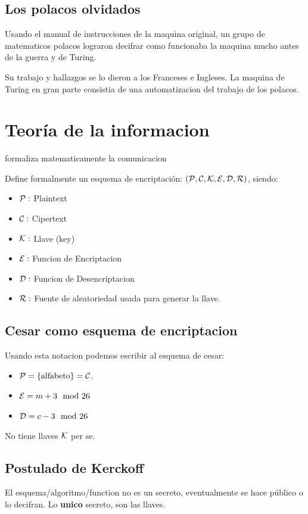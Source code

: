 \documentclass[12pt,a4paper]{report}
\begin{document}
\subsection{Los polacos olvidados}

Usando el manual de instrucciones de la maquina original, un grupo de matematicos polacos lograron decifrar como funcionaba la maquina mucho antes de la guerra y de Turing.

Su trabajo y hallazgos se lo dieron a los Franceses e Ingleses. La maquina de Turing en gran parte consistia de una automatizacion del trabajo de los polacos.



\section{Teoría de la informacion}
\claude formaliza matematicamente la comunicacion

Define formalmente un esquema de encriptación: $(\mathcal{{P}}, \mathcal{{C}}, \mathcal{{K}}, \mathcal{{E}}, \mathcal{{D}}, \mathcal{{R}})$, siendo:

\begin{itemize}
    \item{$\mathcal{{P}}:$ Plaintext }
    \item{$\mathcal{{C}}:$ Cipertext }
    \item{$\mathcal{{K}}:$ Llave (key)}
    \item{$\mathcal{{E}}:$ Funcion de Encriptacion}
    \item{$\mathcal{{D}}:$ Funcion de Desencriptacion}
    \item{$\mathcal{{R}}:$ Fuente de aleatoriedad usada para generar la llave.}
\end{itemize}

\alicebob

\subsection{Cesar como esquema de encriptacion}
Usando esta notacion podemos escribir al esquema de cesar:

\begin{itemize}
\item{$ \mathcal{{P}} = \{\text{alfabeto} \} = \mathcal{{C}}$.}
\item{$\mathcal{{E}} = m + 3 \mod 26$ }
\item{$\mathcal{{D}} = c - 3 \mod 26$ }
\end{itemize}
No tiene llaves $\mathcal{{K}}$ per se.

\subsection{Postulado de Kerckoff}
El esquema/algoritmo/function no es un secreto, eventualmente se hace público o lo decifran. Lo \textbf{unico} secreto, son las llaves.
\end{document}
